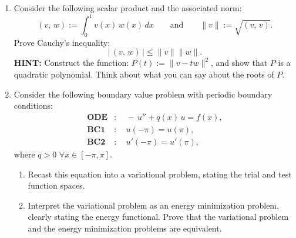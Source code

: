 \documentclass[11pt,leqno]{article}
\newcommand{\LL}{\mathcal{L}}
\begin{document}
\begin{enumerate}
\begin{enumerate}
\item Let $a(x)\equiv1$. From the previous part, show that $G(x;s)=G(s;x)$.
Using an approriate application of Green's formula, show that for a general load
function, $f\in C^{0}(0,1)$, the solution to
\[
  \LL\left(u\right) = -u'' = f(x), \quad u(0)=u(1)=0
\]
is given by
\[
  u(x) = \int_{0}^{1} f(s)\,G(s;x)\,ds.
\]

\end{enumerate}

\item Consider the following scalar product and the associated norm:
\[
  (v,\,w) := \int_{0}^{1} v(x)\,w(x)\,dx
  \qquad\text{and}\qquad
  \|v\| := \sqrt{(v,\,v)}.
\]
Prove Cauchy's inequality:
\[
  \left|\,(v,\,w)\,\right| \le \|v\|\|w\|.
\]
\textbf{HINT:} Construct the function: $P(t):=\|v-tw\|^{2}$, and show that $P$
is a quadratic polynomial. Think about what you can say about the roots of $P$.

\bigskip

\item Consider the following boundary value problem with periodic boundary
conditions:
\begin{align*}
  \textbf{ODE} &: \quad -\, u'' + q(x)\,u = f(x),\\
  \textbf{BC1} &: \quad u(-\pi) = u(\pi),\\
  \textbf{BC2} &: \quad u'(-\pi) = u'(\pi),
\end{align*}
where $q>0$ $\forall x\in[-\pi,\pi]$.

\begin{enumerate}
\item Recast this equation into a variational problem, stating the trial and
test function spaces.

\item Interpret the variational problem as an energy minimization problem,
clearly stating the energy functional. Prove that the variational problem and
the energy minimization problems are equivalent.
\end{enumerate}

\end{enumerate}
\end{document}
